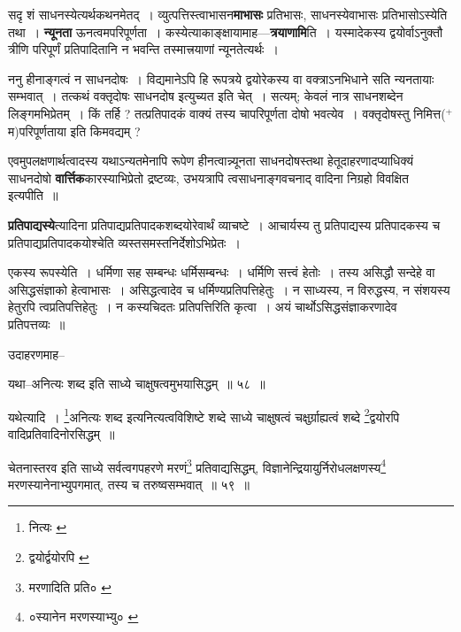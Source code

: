 \documentclass[article,12pt,a4paper]{memoir}
\newcommand{\add}[1]{($^{+}$#1)}
\begin{document}
	  \pstart सदृ\leavevmode{} शं साधनस्येत्यर्थकथनमेतद् । व्युत्पत्तिस्त्वाभासन\textbf{माभासः} प्रतिभासः, साधनस्येवाभासः प्रतिभासोऽस्येति तथा । \textbf{न्यूनता} ऊनत्वमपरिपूर्णता । कस्येत्याकाङ्क्षायामाह—\textbf{त्रयाणामि}ति । यस्मादेकस्य द्वयोर्वाऽनुक्तौ त्रीणि परिपूर्णं प्रतिपादितानि न भवन्ति तस्मात्त्रयाणां न्यूनतेत्यर्थः ।
	\pend
      

	  \pstart ननु हीनाङ्गत्वं न साधनदोषः । विद्यमानेऽपि हि रूपत्रये द्वयोरेकस्य वा वक्त्राऽनभिधाने सति न्यनतायाः सम्भवात् । तत्कथं वक्तृदोषः साधनदोष इत्युच्यत इति चेत् । सत्यम्; केवलं नात्र साधनशब्देन लिङ्गमभिप्रेतम् । किं तर्हि ? तत्प्रतिपादकं वाक्यं तस्य चापरिपूर्णता दोषो भवत्येव । वक्तृदोषस्तु निमित्त\add{म}परिपूर्णताया इति किमवद्यम् ?
	\pend
      

	  \pstart एवमुपलक्षणार्थत्वादस्य यथाऽन्यतमेनापि रूपेण हीनत्वान्न्यूनता साधनदोषस्तथा हेतूदाहरणादप्याधिक्यं साधनदोषो \textbf{वार्त्तिक}कारस्याभिप्रेतो द्रष्टव्यः, उभयत्रापि त्वसाधनाङ्गवचनाद् वादिना निग्रहो विवक्षित इत्यपीति ॥
	\pend
      

	  \pstart \textbf{प्रतिपाद्यस्ये}त्यादिना प्रतिपाद्यप्रतिपादकशब्दयोरेवार्थं व्याचष्टे । आचार्यस्य तु प्रतिपाद्यस्य प्रतिपादकस्य च प्रतिपाद्यप्रतिपादकयोश्चेति व्यस्तसमस्तनिर्देशोऽभिप्रेतः ।
	\pend
      \leavevmode{}
	  \bigskip
	  \begingroup
	

	  \pstart एकस्य रूपस्येति । धर्मिणा सह सम्बन्धः धर्मिसम्बन्धः । धर्मिणि सत्त्वं हेतोः । तस्य असिद्धौ सन्देहे वा असिद्धसंज्ञाको हेत्वाभासः । असिद्धत्वादेव च धर्मिण्यप्रतिपत्तिहेतुः । न साध्यस्य, न विरुद्धस्य, न संशयस्य हेतुरपि त्वप्रतिपत्तिहेतुः । न कस्यचिदतः प्रतिपत्तिरिति कृत्वा । अयं चार्थोऽसिद्धसंज्ञाकरणादेव प्रतिपत्तव्यः ॥
	\pend
       

	  \pstart उदाहरणमाह--
	\pend
       
	  \bigskip
	  \begingroup
	

	  \pstart यथा--अनित्यः शब्द इति साध्ये चाक्षुषत्वमुभयासिद्धम् ॥ ५८ ॥
	\pend
      
	  \endgroup
	 

	  \pstart यथेत्यादि । \footnote{नित्यः \cite{dp-msB}}अनित्यः शब्द इत्यनित्यत्वविशिष्टे शब्दे साध्ये चाक्षुषत्वं चक्षुर्ग्राह्यत्वं शब्दे \footnote{द्वयोर्द्वयोरपि \cite{dp-msB}}द्वयोरपि वादिप्रतिवादिनोरसिद्धम् ॥
	\pend
       
	  \bigskip
	  \begingroup
	

	  \pstart चेतनास्तरव इति साध्ये सर्वत्वगपहरणे मरणं\footnote{मरणादिति प्रति० \cite{dp-msC}} प्रतिवाद्यसिद्धम्, विज्ञानेन्द्रियायुर्निरोधलक्षणस्य\footnote{०स्यानेन मरणस्याभ्यु० \cite{dp-msC}} मरणस्यानेनाभ्युपगमात्, तस्य च तरुष्वसम्भवात् ॥ ५९ ॥
	\pend
      
\end{document}
